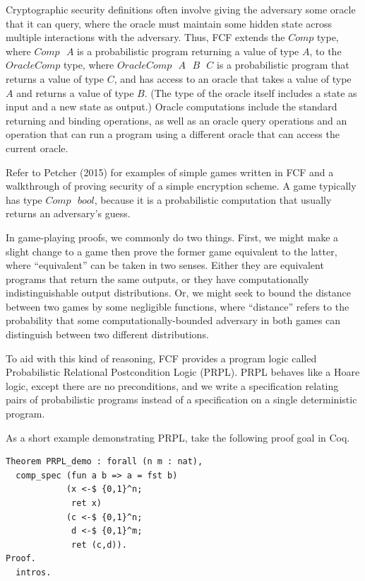 \documentclass[12pt,lot, lof]{puthesis}
\newcommand{\s} {\textrm{ }}
\begin{document}
Cryptographic security definitions often involve giving the adversary some oracle that it can query, where the oracle must maintain some hidden state across multiple interactions with the adversary. Thus, FCF extends the $Comp$ type, where $Comp \s A$ is a probabilistic program returning a value of type $A$, to the $OracleComp$ type, where $OracleComp \s A \s B \s C$ is a probabilistic program that returns a value of type $C$, and has access to an oracle that takes a value of type $A$ and returns a value of type $B$. (The type of the oracle itself includes a state as input and a new state as output.) Oracle computations include the standard returning and binding operations, as well as an oracle query operations and an operation that can run a program using a different oracle that can access the current oracle.

Refer to Petcher (2015) for examples of simple games written in FCF and a walkthrough of proving security of a simple encryption scheme. A game typically has type $Comp \s bool$, because it is a probabilistic computation that usually returns an adversary's guess.

In game-playing proofs, we commonly do two things. First, we might make a slight change to a game then prove the former game equivalent to the latter, where ``equivalent'' can be taken in two senses. Either they are equivalent programs that return the same outputs, or they have computationally indistinguishable output distributions. Or, we might seek to bound the distance between two games by some negligible functions, where ``distance'' refers to the probability that some computationally-bounded adversary in both games can distinguish between two different distributions.

To aid with this kind of reasoning, FCF provides a program logic called Probabilistic Relational Postcondition Logic (PRPL). PRPL behaves like a Hoare logic, except there are no preconditions, and we write a specification relating pairs of probabilistic programs instead of a specification on a single deterministic program.

As a short example demonstrating PRPL, take the following proof goal in Coq.

\begin{lstlisting}
Theorem PRPL_demo : forall (n m : nat),
  comp_spec (fun a b => a = fst b)
            (x <-$ {0,1}^n;
             ret x)
            (c <-$ {0,1}^n;
             d <-$ {0,1}^m;
             ret (c,d)).
Proof.
  intros.
\end{lstlisting}
\end{document}
